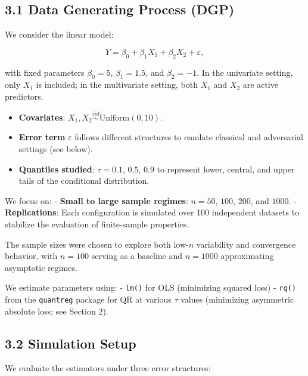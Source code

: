 \documentclass[fleqn,8pt]{latex/stylish_article} %
\providecommand{\tightlist}{%
  \setlength{\itemsep}{0pt}\setlength{\parskip}{0pt}}
\begin{document}
\subsection{3.1 Data Generating Process (DGP)}\label{data-generating-process-dgp}

We consider the linear model:

\[
Y = \beta_0 + \beta_1 X_1 + \beta_2 X_2 + \varepsilon,
\]

with fixed parameters \(\beta_0 = 5\), \(\beta_1 = 1.5\), and \(\beta_2 = -1\). In the univariate setting, only \(X_1\) is included; in the multivariate setting, both \(X_1\) and \(X_2\) are active predictors.

\begin{itemize}
\tightlist
\item
  \textbf{Covariates}: \(X_1, X_2 \overset{iid}{\sim} \text{Uniform}(0,10)\).
\item
  \textbf{Error term} \(\varepsilon\) follows different structures to emulate classical and adversarial settings (see below).
\item
  \textbf{Quantiles studied}: \(\tau = 0.1\), \(0.5\), \(0.9\) to represent lower, central, and upper tails of the conditional distribution.
\end{itemize}

We focus on:
- \textbf{Small to large sample regimes}: \(n = 50\), \(100\), \(200\), and \(1000\).
- \textbf{Replications}: Each configuration is simulated over 100 independent datasets to stabilize the evaluation of finite-sample properties.

The sample sizes were chosen to explore both low-\(n\) variability and convergence behavior, with \(n=100\) serving as a baseline and \(n=1000\) approximating asymptotic regimes.

We estimate parameters using:
- \texttt{lm()} for OLS (minimizing squared loss)
- \texttt{rq()} from the \texttt{quantreg} package for QR at various \(\tau\) values (minimizing asymmetric absolute loss; see Section 2).

\subsection{3.2 Simulation Setup}\label{simulation-setup}

We evaluate the estimators under three error structures:
\end{document}
